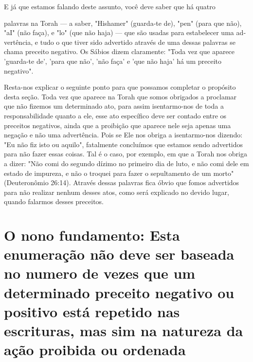 \begin{itemize}
\begin{enumrate}
E já que estamos falando deste assunto, você deve saber que há quatro

palavras na Torah --- a saber, "Hishamer" (guarda-te de), "pen" (para
que não), "aI" (não faça), e "lo" (que não haja) --- que são usadas para
estabelecer uma ad­vertência, e tudo o que tiver sido advertido através
de uma dessas palavras se cha­ma preceito negativo. Os Sábios dizem
claramente: "Toda vez que aparece 'guar­da-te de', 'para que não', 'não
faça' e 'que não haja' há um preceito negativo".

Resta-nos explicar o seguinte ponto para que possamos completar o
propósito desta seção. Toda vez que aparece na Torah que somos obrigados
a proclamar que não fizemos um determinado ato, para assim isentarmo-nos
de toda a responsabilidade quanto a ele, esse ato específico deve ser
contado entre os preceitos negativos, ainda que a proibição que aparece
nele seja ape­nas uma negação e não uma advertência. Pois se Ele nos
obriga a isentarmo-nos dizendo: "Eu não fiz isto ou aquilo", fatalmente
concluímos que estamos sen­do advertidos para não fazer essas coisas.
Tal é o caso, por exemplo, em que a Torah nos obriga a dizer: "Não comi
do segundo dízimo no primeiro dia de luto, e não comi dele em estado de
impureza, e não o troquei para fazer o se­pultamento de um morto"
(Deuteronômio 26:14). Através dessas palavras fica óbvio que fomos
advertidos para não realizar nenhum desses atos, como será explicado no
devido lugar, quando falarmos desses preceitos.

\chapter{O nono fundamento: Esta enumeração não deve ser baseada 
no numero de vezes que um determinado preceito negativo ou 
positivo está repetido nas escrituras, mas sim na natureza da ação proibida ou ordenada}


\end{enumrate}
\end{itemize}
